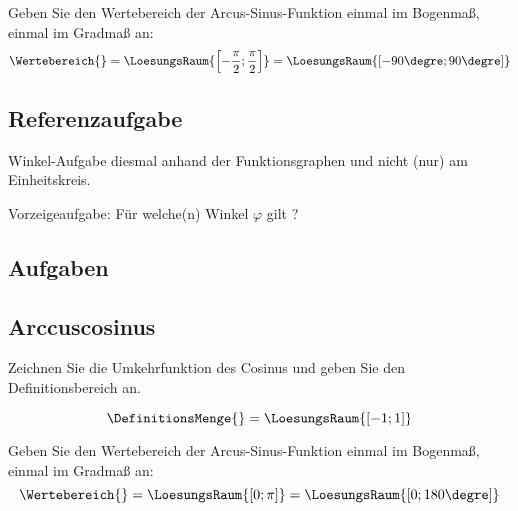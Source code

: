 Geben Sie den Wertebereich der Arcus-Sinus-Funktion einmal im Bogenmaß,
einmal im Gradmaß an:
$$\Wertebereich{} = \LoesungsRaum{\left[-\frac{\pi}{2}; \frac{\pi}{2}\right]}  =  \LoesungsRaum{[-90\degre; 90\degre]}$$
\newpage


\subsection*{Referenzaufgabe}

Winkel-Aufgabe diesmal anhand der Funktionsgraphen und nicht (nur) am Einheitskreis.

Vorzeigeaufgabe: Für welche(n) Winkel $\varphi$ gilt \fbox{$\sin(\varphi) = -\sin(-41.7\degre)$}?


\trigsysDsin{}

\subsection*{Aufgaben}


\TNTeop{}

\subsection{Arccuscosinus}
Zeichnen Sie die Umkehrfunktion des Cosinus und geben Sie den Definitionsbereich an.



$$\DefinitionsMenge{} = \LoesungsRaum{[-1; 1]}$$

Geben Sie den Wertebereich der Arcus-Sinus-Funktion einmal im Bogenmaß,
einmal im Gradmaß an:
$$\Wertebereich{} = \LoesungsRaum{[0; \pi]}  =  \LoesungsRaum{[0; 180\degre]}$$

